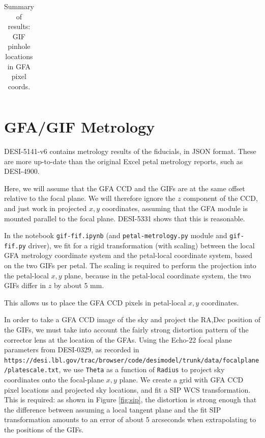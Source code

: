 \documentclass[10pt]{article}
\newcommand{\code}[1]{\texttt{#1}}
\begin{document}
\begin{table}
  \begin{center}
    \begin{footnotesize}
    \begin{tabular}{|ccc|r|r|}
      \hline
      
    \end{tabular}
    \end{footnotesize}
  \end{center}
  \caption{Summary of results: GIF pinhole locations in GFA pixel coords.
  \label{tab:pinholes}}
\end{table}

\section{GFA/GIF Metrology}

DESI-5141-v6 contains metrology results of the fiducials, in JSON
format.  These are more up-to-date than the original Excel petal
metrology reports, such as DESI-4900.

Here, we will assume that the GFA CCD and the GIFs are at the same
offset relative to the focal plane.  We will therefore ignore the $z$
component of the CCD, and just work in projected $x,y$ coordinates,
assuming that the GFA module is mounted parallel to the focal plane.
DESI-5331 shows that this is reasonable.

In the notebook \code{gif-fif.ipynb} (and \code{petal-metrology.py}
module and \code{gif-fif.py} driver), we fit for a rigid
transformation (with scaling) between the local GFA metrology
coordinate system and the petal-local coordinate system, based on the
two GIFs per petal.  The scaling is required to perform the projection
into the petal-local $x,y$ plane, because in the petal-local
coordinate system, the two GIFs differ in $z$ by about 5 mm.

This allows us to place the GFA CCD pixels in petal-local $x,y$
coordinates.

In order to take a GFA CCD image of the sky and project the RA,Dec
position of the GIFs, we must take into account the fairly strong
distortion pattern of the corrector lens at the location of the GFAs.
Using the Echo-22 focal plane parameters from DESI-0329, as recorded
in
\code{https://desi.lbl.gov/trac/browser/code/desimodel/trunk/data/focalplane/platescale.txt},
we use \code{Theta} as a function of \code{Radius} to project sky
coordinates onto the focal-plane $x,y$ plane.  We create a grid with
GFA CCD pixel locations and projected sky locations, and fit a SIP WCS
transformation.  This is required: as shown in Figure \ref{fig:sip},
the distortion is strong enough that the difference between assuming a
local tangent plane and the fit SIP transformation amounts to an error
of about 5 arcseconds when extrapolating to the positions of the GIFs.
\end{document}
